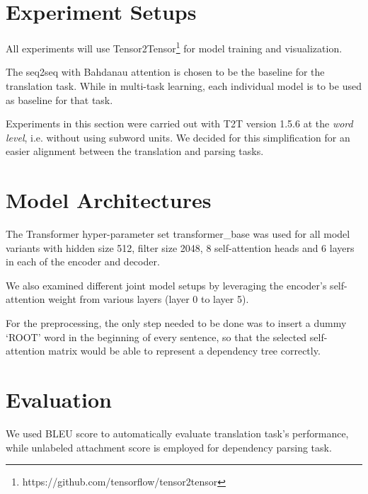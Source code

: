 \section{Experiment Setups}

All experiments will use Tensor2Tensor\footnote{https://github.com/tensorflow/tensor2tensor} for model training and visualization.

The seq2seq with Bahdanau attention is chosen to be the baseline for the translation task. While in multi-task learning, each individual model is to be used as baseline for that task.

Experiments in this section were carried out with T2T version 1.5.6 at the
\emph{word level}, i.e. without using subword units. We decided for this
simplification for an easier alignment between the translation and parsing
tasks.

\section{Model Architectures}

The Transformer hyper-parameter set transformer\_base \cite{TrainingTipsfortheTransformerModel} was used for all model variants with hidden size 512, filter size 2048, 8 self-attention heads and 6 layers in each of the encoder and decoder.

We also examined different joint model setups by leveraging the encoder's self-attention weight from various layers (layer 0 to layer 5).

For the preprocessing, the only step needed to be done was to insert a dummy `ROOT' word in the beginning of every sentence, so that the selected self-attention matrix would be able to represent a dependency tree correctly.

\section{Evaluation}

We used BLEU score to automatically evaluate translation task's performance, while unlabeled attachment score is employed for dependency parsing task.

